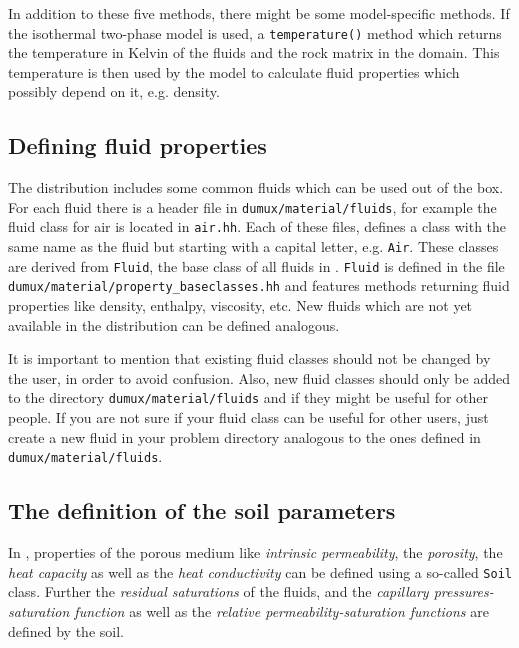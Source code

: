 In addition to these five methods, there might be some model-specific
methods. If the isothermal two-phase model is used, a
\texttt{temperature()} method which returns the temperature in Kelvin
of the fluids and the rock matrix in the domain. This temperature is
then used by the model to calculate fluid properties which possibly
depend on it, e.g. density.


\subsection{Defining fluid properties}\label{tutorial-coupled:description-fluid-class}

The \Dumux distribution includes some common fluids which can be used
out of the box. For each fluid there is a header file in
\texttt{dumux/material/fluids}, for example the fluid class for air is
located in \texttt{air.hh}. Each of these files, defines a class with
the same name as the fluid but starting with a capital letter,
e.g. \texttt{Air}. These classes are derived from \texttt{Fluid}, the
base class of all fluids in \Dumux. \texttt{Fluid} is defined in the
file \texttt{dumux/material/property\_baseclasses.hh} and features
methods returning fluid properties like density, enthalpy, viscosity,
etc. New fluids which are not yet available in the \Dumux distribution
can be defined analogous.

It is important to mention that existing fluid classes should not be
changed by the user, in order to avoid confusion. Also, new fluid
classes should only be added to the directory
\texttt{dumux/material/fluids} and if they might be useful for other
people. If you are not sure if your fluid class can be useful for
other \Dumux users, just create a new fluid in your problem directory
analogous to the ones defined in \texttt{dumux/material/fluids}.

\subsection{The definition of the soil parameters}\label{tutorial-coupled:description-soil-class}

In \Dumux, properties of the porous medium like \textit{intrinsic
  permeability}, the \textit{porosity}, the \textit{heat capacity} as
well as the \textit{heat conductivity} can be defined using a
so-called \texttt{Soil} class. Further the \textit{residual
  saturations} of the fluids, and the \textit{capillary
  pressures-saturation function} as well as the \textit{relative
  permeability-saturation functions} are defined by the soil.

